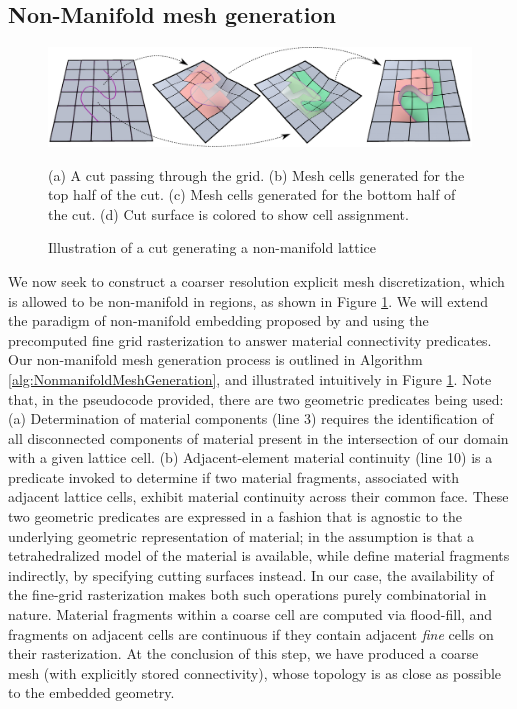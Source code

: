 \subsection{Non-Manifold mesh generation}
\label{sec:nonmanifoldmeshgeneration}

\begin{figure}
  \centering
  \includegraphics[width=.9\textwidth]{chapter_gridiron/images/New_HybridLattice2.pdf}
\vspace*{-.1in}
\caption{Illustration of a cut generating a non-manifold lattice}{ (a) A cut
  passing through the grid. (b) Mesh cells generated for the top half
  of the cut. (c) Mesh cells generated for the bottom half of the
  cut. (d) Cut surface is colored to show cell assignment.}
\vspace*{-.15in}
\label{Fig:MaterialContinuity}
\end{figure}

We now seek to construct a coarser resolution explicit mesh
discretization, which is allowed to be non-manifold in regions, as
shown in Figure \ref{Fig:MaterialContinuity}. We will extend the
paradigm of non-manifold embedding proposed by
\citet{TeranSBNLF:2005} and 
\citet{SifakDF:2007} using the precomputed fine grid rasterization
to answer material connectivity predicates. Our non-manifold mesh
generation process is outlined in Algorithm
\ref{alg:NonmanifoldMeshGeneration}, and illustrated intuitively in
Figure \ref{Fig:MaterialContinuity}. Note that, in the pseudocode
provided, there are two geometric predicates being used: (a)
Determination of material components (line 3) requires the
identification of all disconnected components of material present in
the intersection of our domain with a given lattice cell. (b)
Adjacent-element material continuity (line 10) is a predicate invoked
to determine if two material fragments, associated with adjacent
lattice cells, exhibit material continuity across their common
face. These two geometric predicates are expressed in a fashion that
is agnostic to the underlying geometric representation of material; in
\citet{TeranSBNLF:2005} the assumption is that a
tetrahedralized model of the material is available, while \citet{SifakDF:2007} define material fragments indirectly,
by specifying cutting surfaces instead. In our case, the availability
of the fine-grid rasterization makes both such operations purely
combinatorial in nature. Material fragments within a coarse cell are
computed via flood-fill, and fragments on adjacent cells are
continuous if they contain adjacent \emph{fine} cells on their
rasterization. At the conclusion of this step, we have produced a
coarse mesh (with explicitly stored connectivity), whose topology is
as close as possible to the embedded geometry.

